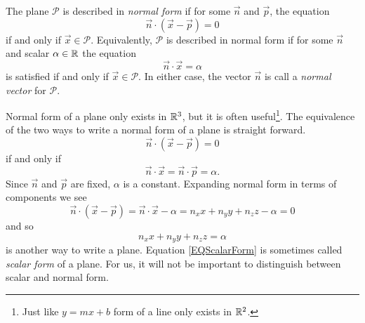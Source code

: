 \begin{center}
\end{center}

\begin{definition}
	The plane $\mathcal P$ is described in \emph{normal form} if for some $\vec n$ and $\vec p$,
	the equation
	\[
		\vec n\cdot(\vec x-\vec p)=0
	\]
	if and only if $\vec x\in\mathcal P$.  Equivalently, $\mathcal P$ is described in normal form if
	for some $\vec n$ and scalar $\alpha\in\mathbb{R}$ the equation
	\[
		\vec n\cdot \vec x=\alpha
	\]
	is satisfied if and only if $\vec x\in \mathcal P$.  In either case, the vector $\vec n$
	is call a \emph{normal vector} for $\mathcal P$.
\end{definition}

Normal form of a plane only exists in $\mathbb{R}^3$, but it is often useful\footnote{ Just like $y=mx+b$ form
of a line only exists in $\mathbb{R}^2$.}.  The equivalence of the two ways to write a normal form of a plane
is straight forward.
\[
		\vec n\cdot(\vec x-\vec p)=0
\]
if and only if
\[
		\vec n\cdot\vec x = \vec n\cdot \vec p = \alpha.
\]
Since $\vec n$ and $\vec p$ are fixed, $\alpha$ is a constant. Expanding normal form in terms of
components we see
\[
		\vec n\cdot(\vec x-\vec p)=\vec n\cdot\vec x-\alpha=
		n_xx+n_yy+n_zz-\alpha=0
\]
and so
\begin{equation}
	\label{EQScalarForm}
		n_xx+n_yy+n_zz=\alpha
\end{equation}
is another way to write a plane.  Equation \eqref{EQScalarForm} is sometimes 
called \emph{scalar form}
of a plane.  For us, it will not be important to distinguish between scalar and normal form.

